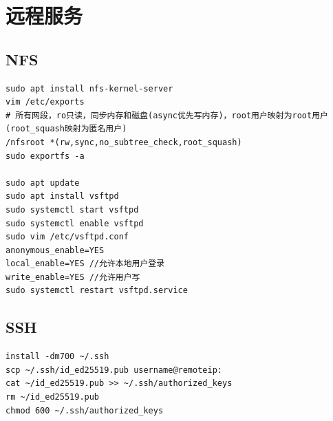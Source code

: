 \section{远程服务}
\subsection{NFS}
\begin{code}[title=nfs service]
	\begin{verbatim}
sudo apt install nfs-kernel-server
vim /etc/exports
# 所有网段，ro只读，同步内存和磁盘(async优先写内存)，root用户映射为root用户(root_squash映射为匿名用户)
/nfsroot *(rw,sync,no_subtree_check,root_squash)
sudo exportfs -a

sudo apt update
sudo apt install vsftpd
sudo systemctl start vsftpd
sudo systemctl enable vsftpd
sudo vim /etc/vsftpd.conf
anonymous_enable=YES
local_enable=YES //允许本地用户登录
write_enable=YES //允许用户写
sudo systemctl restart vsftpd.service
    \end{verbatim}
\end{code}

\subsection{SSH}
\begin{code}[title=ssh service]
	\begin{verbatim}
install -dm700 ~/.ssh
scp ~/.ssh/id_ed25519.pub username@remoteip:
cat ~/id_ed25519.pub >> ~/.ssh/authorized_keys
rm ~/id_ed25519.pub
chmod 600 ~/.ssh/authorized_keys
    \end{verbatim}
\end{code}
